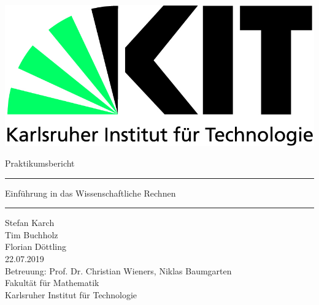 \begin{titlepage}
	\includegraphics[scale=0.5]{kit-logo.jpg} 
	\begin{center} 
		\LARGE 
		\vspace*{2cm}
		\LARGE Praktikumsbericht \BerichtNR
		\vspace*{1.0cm}
		\hrule
		\vspace*{0.2cm}
		{\vspace{0.2cm} \huge Einführung in das Wissenschaftliche Rechnen}\vspace{0.5cm}
		\hrule
		\vspace*{2.5cm}
		\Large Stefan Karch \\
		Tim Buchholz  \\
		Florian Döttling \\
		\vspace*{1cm}
		22.07.2019 \\
		\vspace*{1.5cm}
		\vspace*{4.0cm}
		\Large Betreuung: Prof. Dr. Christian Wieners, Niklas Baumgarten \\[0.5cm]
		\Large Fakultät für Mathematik \\
		\Large Karlsruher Institut für Technologie
	\end{center}
\end{titlepage}